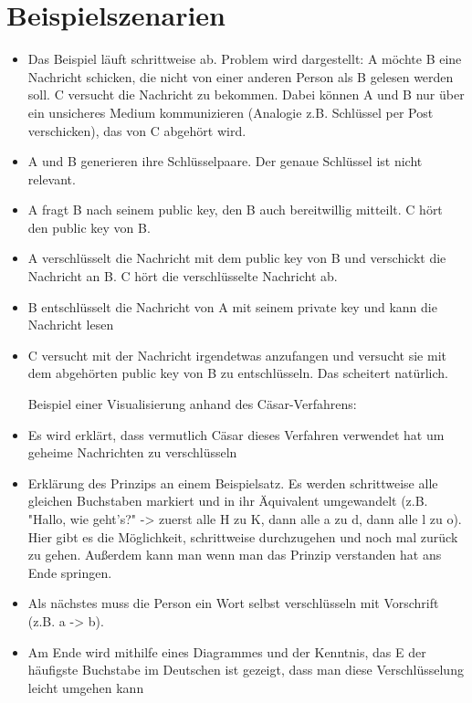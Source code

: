 \documentclass{article}
\begin{document}
\section{Beispielszenarien}
\begin{itemize}
    \item Das Beispiel läuft schrittweise ab. Problem wird dargestellt: A möchte B eine Nachricht schicken, die nicht von einer anderen Person als B gelesen werden soll. C versucht die Nachricht zu bekommen. Dabei können A und B nur über ein unsicheres Medium kommunizieren (Analogie z.B. Schlüssel per Post verschicken), das von C abgehört wird.
\item A und B generieren ihre Schlüsselpaare. Der genaue Schlüssel ist nicht relevant.
\item A fragt B nach seinem public key, den B auch bereitwillig mitteilt. C hört den public key von B.
\item A verschlüsselt die Nachricht mit dem public key von B und verschickt die Nachricht an B. C hört die verschlüsselte Nachricht ab.
\item B entschlüsselt die Nachricht von A mit seinem private key und kann die Nachricht lesen
\item C versucht mit der Nachricht irgendetwas anzufangen und versucht sie mit dem abgehörten public key von B zu entschlüsseln. Das scheitert natürlich.

Beispiel einer Visualisierung anhand des Cäsar-Verfahrens:

\item Es wird erklärt, dass vermutlich Cäsar dieses Verfahren verwendet hat um geheime Nachrichten zu verschlüsseln
\item Erklärung des Prinzips an einem Beispielsatz. Es werden schrittweise alle gleichen Buchstaben markiert und in ihr Äquivalent umgewandelt (z.B. "Hallo, wie geht's?" -> zuerst alle H zu K, dann alle a zu d, dann alle l zu o). Hier gibt es die Möglichkeit, schrittweise durchzugehen und noch mal zurück zu gehen. Außerdem kann man wenn man das Prinzip verstanden hat ans Ende springen.
\item Als nächstes muss die Person ein Wort selbst verschlüsseln mit Vorschrift (z.B. a -> b).
\item Am Ende wird mithilfe eines Diagrammes und der Kenntnis, das E der häufigste Buchstabe im Deutschen ist gezeigt, dass man diese Verschlüsselung leicht umgehen kann
\end{itemize}
\end{document}
